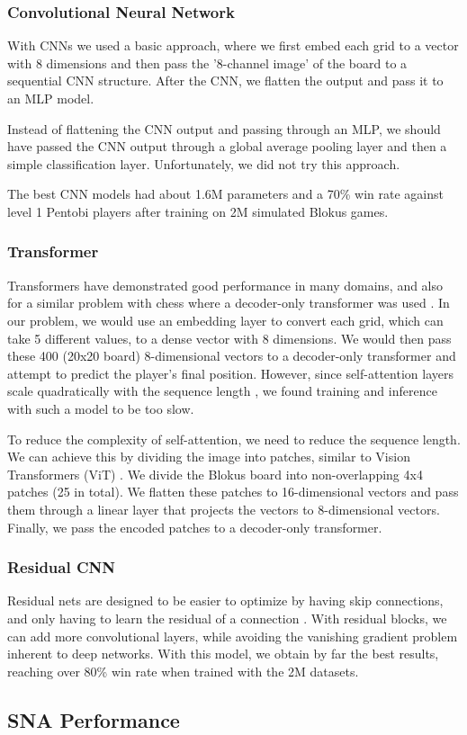 \documentclass{article}
\begin{document}
\subsubsection{Convolutional Neural Network}
With CNNs we used a basic approach, where we first embed each grid to a vector with 8 dimensions and then pass the '8-channel image' of the board to a sequential CNN structure. After the CNN, we flatten the output and pass it to an MLP model.

Instead of flattening the CNN output and passing through an MLP, we should have passed the CNN output through a global average pooling layer and then a simple classification layer. Unfortunately, we did not try this approach.

The best CNN models had about 1.6M parameters and a 70\% win rate against level 1 Pentobi players after training on 2M simulated Blokus games.




\subsubsection{Transformer}
Transformers have demonstrated good performance in many domains, and also for a similar problem with chess where a decoder-only transformer was used \cite{ruoss2024grandmaster}.
In our problem, we would use an embedding layer to convert each grid, which can take 5 different values, to a dense vector with 8 dimensions. We would then pass these 400 (20x20 board) 8-dimensional vectors to a decoder-only transformer and attempt to predict the player's final position. However, since self-attention layers scale quadratically with the sequence length \cite{vaswani2017attention}, we found training and inference with such a model to be too slow.

To reduce the complexity of self-attention, we need to reduce the sequence length. We can achieve this by dividing the image into patches, similar to Vision Transformers (ViT) \cite{dosovitskiy2020image}. We divide the Blokus board into non-overlapping 4x4 patches (25 in total). We flatten these patches to 16-dimensional vectors and pass them through a linear layer that projects the vectors to 8-dimensional vectors.
Finally, we pass the encoded patches to a decoder-only transformer.




\subsubsection{Residual CNN}
Residual nets are designed to be easier to optimize by having skip connections, and only having to learn the residual of a connection \cite{he2016deep}.
With residual blocks, we can add more convolutional layers, while avoiding the vanishing gradient problem inherent to deep networks. With this model, we obtain by far the best results, reaching over 80\% win rate when trained with the 2M datasets.





\subsection{SNA Performance}



\printbibliography
\end{document}
